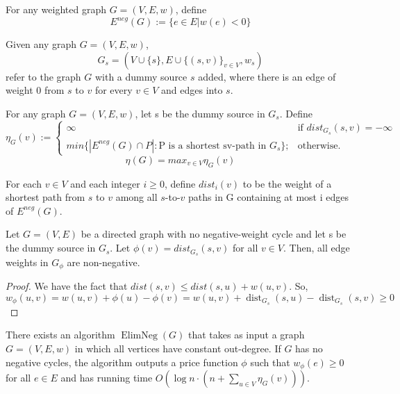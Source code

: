 \documentclass[11pt]{article}
\newcommand{\ElimNeg}{\operatorname{ElimNeg}}
\newcommand{\SPaverage}{\ElimNeg}
\newcommand{\dist}{\operatorname{dist}}
\newcommand{\eneg}{E^{neg}}
\begin{document}
\begin{definition}[$\eneg(G)$]
    For any weighted graph $G=(V, E, w)$, define
    $$\eneg(G) := \{e \in E | w(e) < 0\}$$
\end{definition}

\begin{definition}[$G_s$]
    Given any graph $G=(V, E, w)$,
    $$G_s = (V \cup \{s\}, E \cup \{(s, v)\}_{v \in V}, w_s)$$ refer to the graph $G$ with a dummy source $s$ added, where there is an edge of weight 0 from $s$ to $v$ for every $v \in V$ and edges into $s$.
\end{definition}

\begin{definition} \label{def:numberofnegedges}
    For any graph $G=(V, E, w)$, let s be the dummy source in $G_s$. Define
    $$\eta_G(v) := \begin{cases}\infty &\text{if } dist_{G_s}(s, v) = -\infty\\
    min\{|\eneg(G)\cap P|: \text{P is a shortest sv-path in } G_s\}; &\text{otherwise}.\end{cases}$$
    $$\eta(G) = max_{v \in V} \eta_G(v)$$
\end{definition}

\begin{definition}[$dist_i(v)$] \label{def:distwithnegedges}
    For each $v \in V$ and each integer $i \ge 0$, define $dist_i(v)$ to be the weight of a shortest path from $s$ to $v$ among all $s$-to-$v$ paths in G containing at most i edges of $\eneg(G)$. 
\end{definition}

\begin{lemma} \label{lem:distpf}
    Let $G=(V,E)$ be a directed graph with no negative-weight cycle and let s be the dummy source in $G_s$. Let $\phi(v) = dist_{G_s}(s, v)$ for all $v \in V$. Then, all edge weights in $G_\phi$ are non-negative.
\end{lemma}
\begin{proof}
    We have the fact that $dist(s, v) \le dist(s, u) + w(u, v)$. So,
    $$w_\phi(u, v) = w(u, v) + \phi(u) - \phi(v) = w(u, v) + \dist_{G_s}(s, u) - \dist_{G_s}(s, v) \ge 0$$
\end{proof}

\begin{lemma}[$\SPaverage$] \label{lem:elimneg}
    There exists an algorithm $\ElimNeg(G)$ that takes as input a graph $G=(V, E, w)$ in which all vertices have constant out-degree. If $G$ has no negative cycles, the algorithm outputs a price function $\phi$ such that $w_\phi(e) \ge 0$ for all $e \in E$ and has running time $O(\log n \cdot (n + \sum_{u \in V}\eta_G(v)))$.
\end{lemma}
\end{document}
